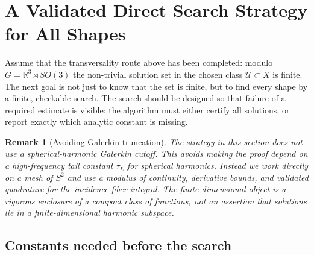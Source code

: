 \documentclass[12pt]{article}
\newtheorem{remark}[theorem]{Remark}
\begin{document}
\section{A Validated Direct Search Strategy for All Shapes}

Assume that the transversality route above has been completed: modulo
$G=\mathbb R^3\rtimes SO(3)$ the non-trivial solution set in the chosen class
$\mathcal U\subset X$ is finite. The next goal is not just to know that the
set is finite, but to find every shape by a finite, checkable search. The
search should be designed so that failure of a required estimate is visible:
the algorithm must either certify all solutions, or report exactly which
analytic constant is missing.

\begin{remark}[Avoiding Galerkin truncation]
  The strategy in this section does not use a spherical-harmonic Galerkin
  cutoff. This avoids making the proof depend on a high-frequency tail constant
  $\tau_L$ for spherical harmonics. Instead we work directly on a mesh of
  $S^2$ and use a modulus of continuity, derivative bounds, and validated
  quadrature for the incidence-fiber integral. The finite-dimensional object is
  a rigorous enclosure of a compact class of functions, not an assertion that
  solutions lie in a finite-dimensional harmonic subspace.
\end{remark}

\subsection{Constants needed before the search}
\end{document}
